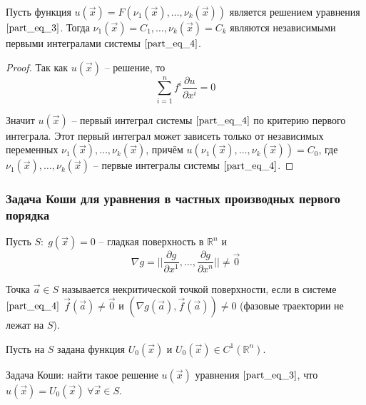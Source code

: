\begin{theorem}
	Пусть функция $u \left( \vec{x} \right) = F \left( \nu_1 \left( \vec{x} \right), \dots, \nu_k \left( \vec{x} \right) \right)$ является решением уравнения $\eqref{part_eq_3}$. Тогда $\nu_1 \left( \vec{x} \right) = C_1, \dots, \nu_k \left( \vec{x} \right) = C_k$ являются независимыми первыми интегралами системы $\eqref{part_eq_4}$. 
\end{theorem}
\begin{proof}
	Так как $u \left( \vec{x} \right)$ -- решение, то 
	\begin{equation*}
		\sum \limits_{i = 1}^{n} f^i \frac{\partial u}{\partial x^i} = 0
	\end{equation*}
	
	Значит $u \left( \vec{x} \right)$ -- первый интеграл системы $\eqref{part_eq_4}$ по критерию первого интеграла. Этот первый интеграл может зависеть только от независимых переменных $\nu_1 \left( \vec{x} \right), \dots, \nu_k \left( \vec{x} \right)$, причём $u \left( \nu_1 \left( \vec{x} \right), \dots, \nu_k \left( \vec{x} \right) \right) = C_0$, где $\nu_1 \left( \vec{x} \right), \dots, \nu_k \left( \vec{x} \right)$ -- первые интегралы системы $\eqref{part_eq_4}$.
\end{proof}

\subsubsection{Задача Коши для уравнения в частных производных первого порядка}

Пусть $S: \; g \left( \vec{x} \right) = 0$ -- гладкая поверхность в $\mathbb{R}^n$ и 
\begin{equation*}
	\nabla g = \bigg| \bigg| \frac{\partial g}{\partial x^{1}}, \dots, \frac{\partial g}{\partial x^{n}} \bigg| \bigg| \neq \vec{0}
\end{equation*}

\begin{definition}
	Точка $\vec{a} \in S$ называется некритической точкой поверхности, если в системе $\eqref{part_eq_4}$ $\vec{f} \left( \vec{a} \right) \neq \vec{0}$ и $ \left( \nabla g \left( \vec{a} \right), \vec{f} \left( \vec{a} \right) \right) \neq 0$  (фазовые траектории не лежат на $S$).
\end{definition}

Пусть на $S$ задана функция $U_0 \left( \vec{x} \right)$ и $U_0 \left( \vec{x} \right) \in C^1 \left( \mathbb{R}^n \right)$.

Задача Коши: найти такое решение $u \left( \vec{x} \right)$ уравнения $\eqref{part_eq_3}$, что $u \left( \vec{x} \right) = U_0 \left( \vec{x} \right) \; \forall \vec{x} \in S$.

